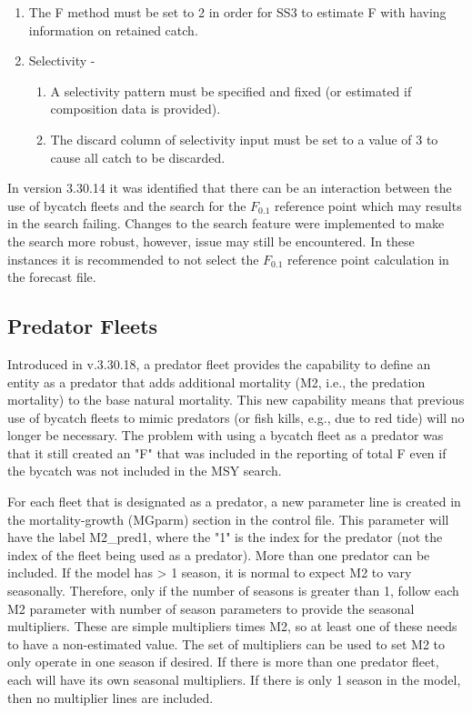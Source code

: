 \begin{enumerate}
	\item The F method must be set to 2 in order for SS3 to estimate F with having information on retained catch.
	\item Selectivity - 
	\begin{enumerate}
		\item A selectivity pattern must be specified and fixed (or estimated if composition data is provided).
		\item The discard column of selectivity input must be set to a value of 3 to cause all catch to be discarded.
	\end{enumerate}	
\end{enumerate}

In version 3.30.14 it was identified that there can be an interaction between the use of bycatch fleets and the search for the $F_{0.1}$ reference point which may results in the search failing.  Changes to the search feature were implemented to make the search more robust, however, issue may still be encountered. In these instances it is recommended to not select the $F_{0.1}$ reference point calculation in the forecast file.

\subsection{Predator Fleets}

Introduced in v.3.30.18, a predator fleet provides the capability to define an entity as a predator that adds additional mortality (M2, i.e., the predation mortality) to the base natural mortality. This new capability means that previous use of bycatch fleets to mimic predators (or fish kills, e.g., due to red tide) will no longer be necessary. The problem with using a bycatch fleet as a predator was that it still created an "F" that was included in the reporting of total F even if the bycatch was not included in the MSY search.

For each fleet that is designated as a predator, a new parameter line is created in the mortality-growth (MGparm) section in the control file. This parameter will have the label M2\_pred1, where the "1" is the index for the predator (not the index of the fleet being used as a predator). More than one predator can be included. If the model has > 1 season, it is normal to expect M2 to vary seasonally. Therefore, only if the number of seasons is greater than 1, follow each M2 parameter with number of season parameters to provide the seasonal multipliers. These are simple multipliers times M2, so at least one of these needs to have a non-estimated value. The set of multipliers can be used to set M2 to only operate in one season if desired. If there is more than one predator fleet, each will have its own seasonal multipliers. If there is only 1 season in the model, then no multiplier lines are included.

